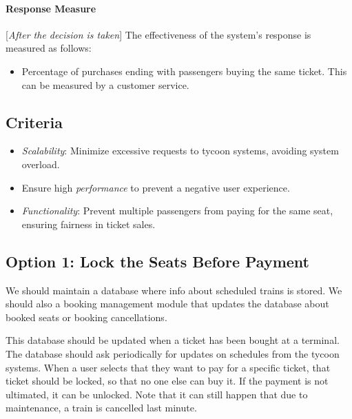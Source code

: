 \paragraph{Response Measure}[\textit{After the decision is taken}] The effectiveness of the system's response is measured as follows:
\begin{itemize}
    \item Percentage of purchases ending with passengers buying the same ticket. This can be measured by a customer service.
\end{itemize}

\subsection*{Criteria}
\begin{itemize}
    \item \textit{Scalability}: Minimize excessive requests to tycoon systems, avoiding system overload.
    \item Ensure high \textit{performance} to prevent a negative user experience.
    \item \textit{Functionality}: Prevent multiple passengers from paying for the same seat, ensuring fairness in ticket sales.
\end{itemize}

\subsection*{Option 1: Lock the Seats Before Payment}
We should maintain a database where info about scheduled trains is stored. 
We should also a booking management module that updates the database about booked seats or booking cancellations.

This database should be updated when a ticket has been bought at a terminal. The database should ask periodically for updates on schedules from the tycoon systems. When a user selects that they want to pay for a specific ticket, that ticket should be locked, so that no one else can buy it. If the payment is not ultimated, it can be unlocked. Note that it can still happen that due to maintenance, a train is cancelled last minute. 



